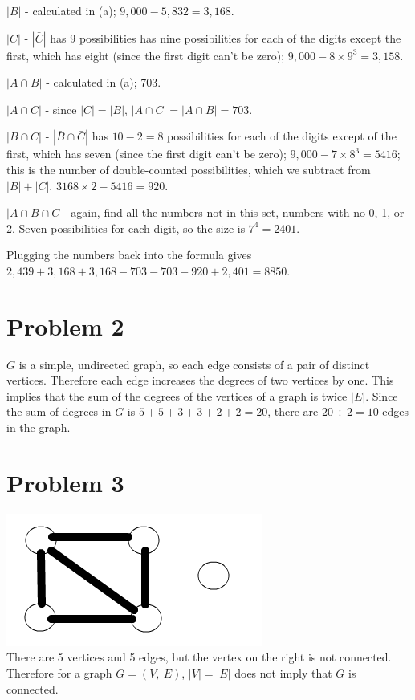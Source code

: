 \documentclass[11pt]{article}
\begin{document}
\begin{enumerate}[(a)]
	$|B|$ - calculated in (a); $9,000 -5,832 = 3,168$.
	
	$|C|$ - $|\bar{C}|$ has 9 possibilities has nine possibilities for each of the digits except the first, which has eight (since the first digit can't be zero); $9,000 - 8\times 9^3 = 3,158$.
	
	$|A \cap B|$ - calculated in (a); 703.
	
	$|A \cap C|$ - since $|C|= |B|$, $|A \cap C| = |A \cap B| = 703$.
	
	$|B \cap C|$ - $|\bar{B} \cap \bar{C}|$ has $10-2 =8 $ possibilities for each of the digits except of the first, which has seven (since the first digit can't be zero); $9,000 - 7\times 8^3 = 5416$; this is the number of double-counted possibilities, which we subtract from $|B| + |C|$. $3168\times 2 - 5416 = 920$.
	
	$|A \cap B \cap C$ - again, find all the numbers not in this set, numbers with no 0, 1, or 2. Seven possibilities for each digit, so the size is $7^4 = 2401$.
	
	Plugging the numbers back into the formula gives $2,439 + 3,168 + 3,168 - 703 - 703 - 920 + 2,401 = 8850$.
	
\end{enumerate}


\section*{Problem 2}

$G$ is a simple, undirected graph, so each edge consists of a pair of distinct vertices. Therefore each edge increases the degrees of two vertices by one. This implies that the sum of the degrees of the vertices of a graph is twice $|E|$. Since the sum of degrees in $G$ is $5+5+3+3+2+2 = 20$, there are $20 \div 2 = 10$ edges in the graph.

\section*{Problem 3}

\includegraphics[scale=.5]{images/p3}\\
There are 5 vertices and 5 edges, but the vertex on the right is not connected. Therefore for a graph $G = (V,\ E)$, $|V| = |E|$ does not imply that $G$ is connected.
\end{document}
